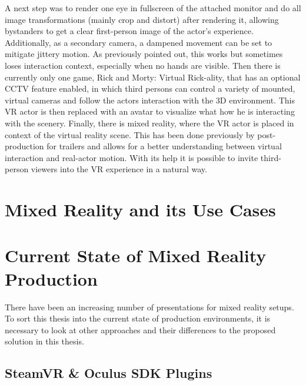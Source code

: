 A next step was to render one eye in fullscreen of the attached monitor and do 
all image transformations (mainly crop and distort) after rendering it, 
allowing bystanders to get a clear first-person image of the actor's 
experience. Additionally, as a secondary camera, a dampened movement can be set 
to mitigate jittery motion. As previously pointed out, this works but sometimes 
loses interaction context, especially when no hands are visible. 
\newline
Then there is currently only one game, Rick and Morty: Virtual Rick-ality, that 
has an optional CCTV feature enabled, in which third persons can control a 
variety of mounted, virtual cameras and follow the actors interaction with the 
3D environment. This VR actor is then replaced with an avatar to visualize what 
how he is interacting with the scenery.
\newline
Finally, there is mixed reality, where the VR actor is placed in context of 
the virtual reality scene. This has been done previously by post-production for 
trailers and allows for a better understanding between virtual interaction and 
real-actor motion. With its help it is possible to invite third-person viewers 
into the VR experience in a natural way.

\section{Mixed Reality and its Use Cases}


\section{Current State of Mixed Reality Production}

There have been an increasing number of presentations for mixed reality setups. 
To sort this thesis into the current state of production environments, it is 
necessary to look at other approaches and their differences to the proposed 
solution in this thesis.

\subsection{SteamVR \& Oculus SDK Plugins}

